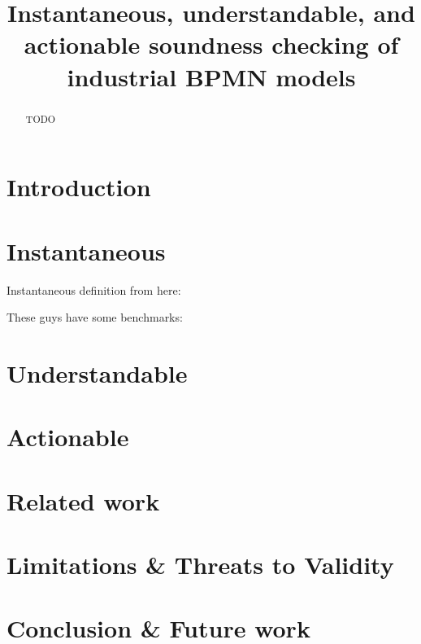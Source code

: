\documentclass[runningheads]{llncs}
\begin{document}
%
\title{Instantaneous, understandable, and actionable soundness checking of industrial BPMN models}
%
%
%
\maketitle              %
%
\begin{abstract}
TODO
\end{abstract}

\section{Introduction}

\cite{corradiniClassificationBPMNCollaborations2018}

\section{Instantaneous}
Instantaneous definition from here: \cite{fahlandAnalysisDemandInstantaneous2011}

These guys have some benchmarks:
\cite{corradiniFormalApproachAnalysis2021}

\section{Understandable}
\section{Actionable}

\section{Related work}

\cite{krauterFormalizationAnalysisBPMN2023}

\cite{vangorpVisualTokenbasedFormalization2013}

\cite{corradiniBProVeToolSupport2017,corradiniFormalApproachAnalysis2021}

\section{Limitations \& Threats to Validity}

\section{Conclusion \& Future work}

 

\end{document}
